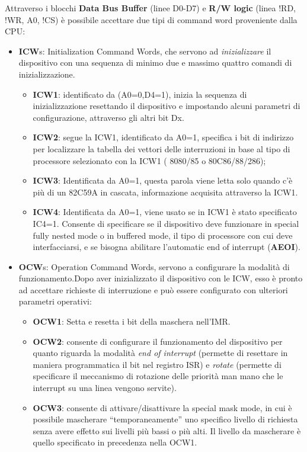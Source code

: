 Attraverso i blocchi \textbf{Data Bus Buffer} (linee D0-D7) e \textbf{R/W logic} (linea !RD, !WR, A0, !CS) è possibile accettare due tipi di command word proveniente dalla CPU:
\begin{itemize}
    \item \textbf{ICW}s: Initialization Command Words, che servono ad \textit{inizializzare} il dispositivo con una sequenza di minimo due e massimo quattro comandi di inizializzazione.
    \begin{itemize}
        \item \textbf{ICW1}: identificato da (A0=0,D4=1), inizia la sequenza di inizializzazione resettando il dispositivo e impostando alcuni parametri di configurazione, attraverso gli altri bit Dx.
        \item \textbf{ICW2}: segue la ICW1, identificato da A0=1, specifica i bit di indirizzo per localizzare la tabella dei vettori delle interruzioni in base al tipo di processore selezionato con la ICW1 ( 8080/85 o 80C86/88/286);
        \item \textbf{ICW3}: Identificata da A0=1, questa parola viene letta solo quando c'è più di un 82C59A in cascata, informazione acquisita attraverso la ICW1.
        \item \textbf{ICW4}: Identificata da A0=1, viene usato se in ICW1 è stato specificato IC4=1. Consente di specificare se il dispositivo deve funzionare in special fully nested mode o in buffered mode, il tipo 
        di processore con cui deve interfacciarsi, e se bisogna abilitare l'automatic end of interrupt (\textbf{AEOI}).
    \end{itemize}
    \item \textbf{OCW}s: Operation Command Words, servono a configurare la modalità di funzionamento.Dopo aver inizializzato il dispositivo con le ICW, esso è pronto ad accettare richieste di interruzione e può essere configurato con ulteriori parametri operativi:
    \begin{itemize}
        \item \textbf{OCW1}: Setta e resetta i bit della maschera nell'IMR.
        \item \textbf{OCW2}: consente di configurare il funzionamento del dispositivo per quanto riguarda la modalità \textit{end of interrupt} (permette di resettare in maniera programmatica il bit nel registro ISR) e \textit{rotate} (permette di specificare il meccanismo di rotazione delle priorità man mano che le interrupt su una linea vengono servite).
        \item \textbf{OCW3}:  consente di attivare/disattivare la special mask mode, in cui è possibile mascherare  “temporaneamente” uno specifico livello di richiesta senza avere effetto sui livelli più bassi o più alti. Il livello da mascherare è quello specificato in precedenza nella OCW1.
    \end{itemize}
\end{itemize}


